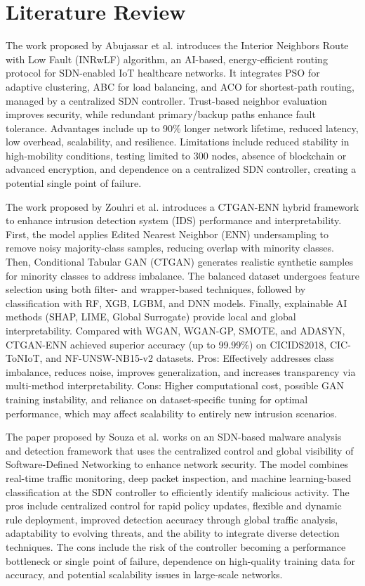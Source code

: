\documentclass[a4paper,fleqn]{cas-dc}
\numberwithin{equation}{section}
\begin{document}
\section{Literature Review}

The work proposed by Abujassar et al.\cite{Abujassar2025} introduces the Interior Neighbors Route with Low Fault (INRwLF) algorithm, an AI-based, energy-efficient routing protocol for SDN-enabled IoT healthcare networks. It integrates PSO for adaptive clustering, ABC for load balancing, and ACO for shortest-path routing, managed by a centralized SDN controller. Trust-based neighbor evaluation improves security, while redundant primary/backup paths enhance fault tolerance. Advantages include up to 90\% longer network lifetime, reduced latency, low overhead, scalability, and resilience. Limitations include reduced stability in high-mobility conditions, testing limited to 300 nodes, absence of blockchain or advanced encryption, and dependence on a centralized SDN controller, creating a potential single point of failure.

The work proposed by Zouhri et al.\cite{Zouhri2025} introduces a CTGAN-ENN hybrid framework to enhance intrusion detection system (IDS) performance and interpretability. First, the model applies Edited Nearest Neighbor (ENN) undersampling to remove noisy majority-class samples, reducing overlap with minority classes. Then, Conditional Tabular GAN (CTGAN) generates realistic synthetic samples for minority classes to address imbalance. The balanced dataset undergoes feature selection using both filter- and wrapper-based techniques, followed by classification with RF, XGB, LGBM, and DNN models. Finally, explainable AI methods (SHAP, LIME, Global Surrogate) provide local and global interpretability. Compared with WGAN, WGAN-GP, SMOTE, and ADASYN, CTGAN-ENN achieved superior accuracy (up to 99.99\%) on CICIDS2018, CIC-ToNIoT, and NF-UNSW-NB15-v2 datasets. Pros: Effectively addresses class imbalance, reduces noise, improves generalization, and increases transparency via multi-method interpretability. Cons: Higher computational cost, possible GAN training instability, and reliance on dataset-specific tuning for optimal performance, which may affect scalability to entirely new intrusion scenarios.

The paper proposed by Souza et al.\cite{Souza2025} works on an SDN-based malware analysis and detection framework that uses the centralized control and global visibility of Software-Defined Networking to enhance network security. The model combines real-time traffic monitoring, deep packet inspection, and machine learning-based classification at the SDN controller to efficiently identify malicious activity. The pros include centralized control for rapid policy updates, flexible and dynamic rule deployment, improved detection accuracy through global traffic analysis, adaptability to evolving threats, and the ability to integrate diverse detection techniques. The cons include the risk of the controller becoming a performance bottleneck or single point of failure, dependence on high-quality training data for accuracy, and potential scalability issues in large-scale networks.
\end{document}
